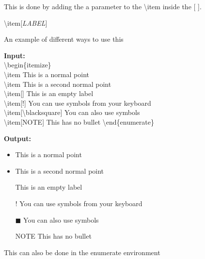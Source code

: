 \documentclass{article}
\newcommand{\bs}[1]{\textbackslash{}#1} %
\begin{document}
This is done by adding the a parameter to the \bs{item} inside the [ ].

\begin{center}
    \bs{item}[\textit{LABEL}]
\end{center}

An example of different ways to use this \\

\begin{multicols}{2}
    \begin{minipage}{\linewidth}
        \textbf{Input:} \\
        \bs{begin\{itemize\}} \\
        \bs{item} This is a normal point \\
        \bs{item} This is a second normal point \\
        \bs{item}[] This is an empty label \\
        \bs{item}[!] You can use symbols from your keyboard \\
        \bs{item}[\bs{blacksquare}] You can also use symbols \\
        \bs{item}[NOTE] This has no bullet
        \bs{end\{enumerate\}}
    \end{minipage}

    \begin{minipage}{\linewidth}
        \textbf{Output:} \\
        \begin{itemize}
            \item This is a normal point 
            \item This is a second normal point 
            \item [] This is an empty label 
            \item [!] You can use symbols from your keyboard
            \item [$\blacksquare$] You can also use symbols
            \item [NOTE] This has no bullet
        \end{itemize}
    \end{minipage}
\end{multicols}

This can also be done in the enumerate environment
\end{document}
